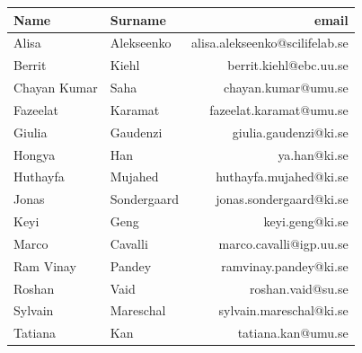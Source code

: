 \documentclass[12pt]{article}\usepackage[]{graphicx}\usepackage[]{color}
\begin{document}





\begin{table}[ht]
\centering
\begin{tabular}{llr}
  \toprule
Name & Surname & email \\ 
  \midrule
Alisa & Alekseenko & alisa.alekseenko@scilifelab.se \\ 
   \rowcolor[gray]{0.95}Berrit & Kiehl & berrit.kiehl@ebc.uu.se \\ 
  Chayan Kumar & Saha & chayan.kumar@umu.se \\ 
   \rowcolor[gray]{0.95}Fazeelat & Karamat & fazeelat.karamat@umu.se \\ 
  Giulia & Gaudenzi & giulia.gaudenzi@ki.se \\ 
   \rowcolor[gray]{0.95}Hongya & Han & ya.han@ki.se \\ 
  Huthayfa & Mujahed & huthayfa.mujahed@ki.se \\ 
   \rowcolor[gray]{0.95}Jonas & Sondergaard & jonas.sondergaard@ki.se \\ 
  Keyi & Geng & keyi.geng@ki.se \\ 
   \rowcolor[gray]{0.95}Marco & Cavalli & marco.cavalli@igp.uu.se \\ 
  Ram Vinay & Pandey & ramvinay.pandey@ki.se \\ 
   \rowcolor[gray]{0.95}Roshan & Vaid & roshan.vaid@su.se \\ 
  Sylvain & Mareschal & sylvain.mareschal@ki.se \\ 
   \rowcolor[gray]{0.95}Tatiana & Kan & tatiana.kan@umu.se \\ 
   \bottomrule
\end{tabular}
\end{table}




\end{document}
